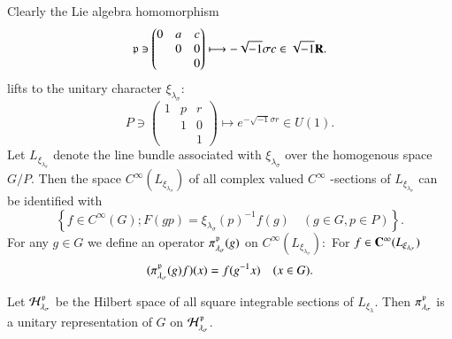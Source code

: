 Clearly the Lie algebra homomorphism
$$
\mathfrak{p} \ni \begin{pmatrix}
0 & a & c \\
  &  0 & 0\\
  &    & 0
\end{pmatrix}
\longmapsto - \sqrt{-1}\sigma c \in \sqrt{-1}\mathbf{R}.
$$
lifts to the unitary character $\xi_{\lambda_{\sigma}}$:
$$
P \ni \begin{pmatrix}
1 & p & r \\
  &  1 & 0\\
  &    & 1
\end{pmatrix}
\longmapsto e^{-\sqrt{-1}\sigma r} \in U(1).
$$
Let $L_{\xi_{\lambda_{\sigma}}}$ denote the line bundle associated with $\xi_{\lambda_{\sigma}}$ over the homogenous space $G /P$. Then the space $C^{\infty}(L_{\xi_{\lambda_{\sigma}}})$ of all complex valued $C^{\infty}$ -sections of $L_{\xi_{\lambda_{\sigma}}}$ can be identified with
$$
\left\{ f \in C^{\infty}(G); F(gp) = \xi_{\lambda_{\sigma}}(p)^{-1}f(g) \quad (g \in G, p \in P)\right\}.
$$
For any $g \in G$ we define an operator $\pi_{\lambda_{\sigma}}^{\mathfrak{p}}(g)$ on $C^{\infty}(L_{\xi_{\lambda_{\sigma}}}):$
For $f \in \mathbf{C}^{\infty}(L_{\xi_{\lambda_{\sigma}}})$
$$
(\pi_{\lambda_{\sigma}}^{\mathfrak{p}}(g)f)(x)=f(g^{-1}x) \quad (x \in G).
$$

Let $\mathcal{H}_{\lambda_{\sigma}}^{\mathfrak{p}}$ be the Hilbert space of all square integrable sections of $L_{\xi_{\lambda}}$. Then
$\pi_{\lambda_{\sigma}}^{\mathfrak{p}}$ is a unitary representation of $G$ on $\mathcal{H}_{\lambda_{\sigma}}^{\mathfrak{p}}$.

